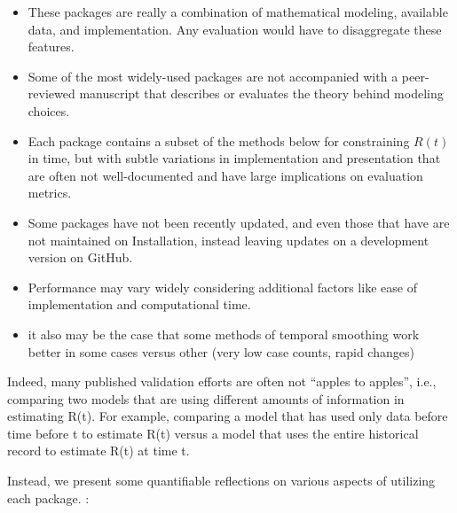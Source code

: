 \documentclass[
  letterpaper,
  DIV=11,
  numbers=noendperiod]{scrreprt}
\providecommand{\tightlist}{%
  \setlength{\itemsep}{0pt}\setlength{\parskip}{0pt}}\usepackage{longtable,booktabs,array}
\begin{document}
\begin{itemize}
\tightlist
\item
  These packages are really a combination of mathematical modeling,
  available data, and implementation. Any evaluation would have to
  disaggregate these features.
\item
  Some of the most widely-used packages are not accompanied with a
  peer-reviewed manuscript that describes or evaluates the theory behind
  modeling choices.
\item
  Each package contains a subset of the methods below for constraining
  \(R(t)\) in time, but with subtle variations in implementation and
  presentation that are often not well-documented and have large
  implications on evaluation metrics.
\item
  Some packages have not been recently updated, and even those that have
  are not maintained on Installation, instead leaving updates on a
  development version on GitHub.
\item
  Performance may vary widely considering additional factors like ease
  of implementation and computational time.
\item
  it also may be the case that some methods of temporal smoothing work
  better in some cases versus other (very low case counts, rapid
  changes)
\end{itemize}

Indeed, many published validation efforts are often not ``apples to
apples'', i.e., comparing two models that are using different amounts of
information in estimating R(t). For example, comparing a model that has
used only data before time before t to estimate R(t) versus a model that
uses the entire historical record to estimate R(t) at time t.

Instead, we present some quantifiable reflections on various aspects of
utilizing each package. :
\end{document}
